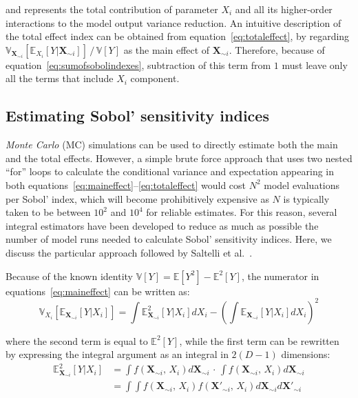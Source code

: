 \noindent
and represents the total contribution of parameter $X_i$ and all its higher-order interactions to the model output variance reduction. An intuitive description of the total effect index can be obtained from equation~\eqref{eq:totaleffect}, by regarding $\mathbb{V}_{\mathbf{X}_{\sim i}}[\mathbb{E}_{X_i}[Y|\mathbf{X}_{\sim i}]]\,/\,\mathbb{V}[Y]$ as the main effect of $\mathbf{X}_{\sim i}$. Therefore, because of equation~\eqref{eq:sumofsobolindexes}, subtraction of this term from $1$ must leave only all the terms that include $X_i$ component.

%
%
%
\subsection{Estimating Sobol' sensitivity indices}
\textit{Monte Carlo} (\acs{MC}) simulations can be used to directly estimate both the main and the total effects. However, a simple brute force approach that uses two nested \enquote{for} loops to calculate the conditional variance and expectation appearing in both equations~\eqref{eq:maineffect}--\eqref{eq:totaleffect} would cost $N^2$ model evaluations per Sobol' index, which will become prohibitively expensive as $N$ is typically taken to be between $10^2$ and $10^4$ for reliable estimates. For this reason, several integral estimators have been developed to reduce as much as possible the number of model runs needed to calculate Sobol' sensitivity indices. Here, we discuss the particular approach followed by Saltelli et al.~\cite{Saltelli:2010}.

\vspace{0.2cm}
Because of the known identity $\mathbb{V}[Y] = \mathbb{E}[Y^2] - \mathbb{E}^2[Y]$, the numerator in equations~\eqref{eq:maineffect} can be written as:
%
\begin{equation}
    \mathbb{V}_{X_i}[\mathbb{E}_{\mathbf{X}_{\sim i}}[Y|X_i]] = \int \mathbb{E}^2_{\mathbf{X}_{\sim i}}[Y|X_i]dX_i - \left(\int \mathbb{E}_{\mathbf{X}_{\sim i}}[Y|X_i]dX_i\right)^2
\end{equation}

\noindent
where the second term is equal to $\mathbb{E}^2[Y]$, while the first term can be rewritten by expressing the integral argument as an integral in $2(D - 1)$ dimensions:
%
\begin{align}
    \mathbb{E}^2_{\mathbf{X}_{\sim i}}[Y|X_i] &= \int f(\mathbf{X}_{\sim i},\, X_i)d\mathbf{X}_{\sim i}\,\cdot\,\int f(\mathbf{X}_{\sim i},\, X_i)d\mathbf{X}_{\sim i} \\
    &= \int\int f(\mathbf{X}_{\sim i},\, X_i)f(\mathbf{X'}_{\sim i},\, X_i)d\mathbf{X}_{\sim i}d\mathbf{X'}_{\sim i}
\end{align}

